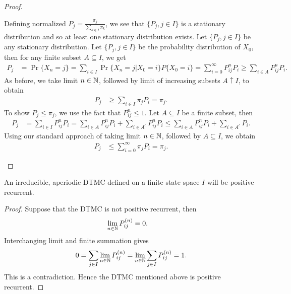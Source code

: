 \documentclass[a4paper,10pt,english]{article}
\begin{document}
\begin{proof}
\begin{enumerate}[i)]
Defining normalized $P_j = \frac{\pi_j}{\sum_{k \in I}\pi_k}$, 
we see that $\{P_j,j \in I\}$ is a stationary distribution and so at least one stationary distribution exists. 
Let $\{P_j,j \in I\}$ be any stationary distribution. Let $\{P_j,j \in I\}$ be the probability distribution of $X_0$, then for any finite subset $A \subseteq I$, we get 
\begin{align*}
P_j &= \Pr\{X_n = j\} = \sum_{i \in I} \Pr\{X_n = j|X_0 = i\} P\{X_0 = i\} = \sum_{i=0}^{\infty} P_{ij}^nP_i \geq \sum_{i \in A} P_{ij}^nP_i.
\end{align*}
As before, we take limit $n \in \mathbb{N}$, followed by limit of increasing subsets $A \uparrow I$, to obtain
\begin{align*}
P_j &\geq \sum_{i \in I} \pi_j P_i = \pi_j.
\end{align*}
To show $P_j \leq \pi_j$, we use the fact that $P_{ij}^n \leq 1$. Let $A \subseteq I$ be a finite subset, then
\begin{align*}
P_j &= \sum_{i \in I} P_{ij}^nP_i = \sum_{i \in A}P_{ij}^nP_i + \sum_{i \in A^c}P_{ij}^nP_i \leq \sum_{i \in A} P_{ij}^{n}P_i + \sum_{i \in A^c} P_i.
\end{align*}
Using our standard approach of taking limit $n \in \mathbb{N}$, followed by $A \subseteq I$, we obtain
\begin{align*}
P_j &\leq \sum_{i=0}^{\infty} \pi_j P_i = \pi_j.
\end{align*}
\end{enumerate}
\end{proof}

\begin{cor} An irreducible, aperiodic DTMC defined on a finite state space $I$ will be positive recurrent.
\end{cor}
\begin{proof}
Suppose that the DTMC is not positive recurrent, then 
\begin{align*}
\lim_{n \in \mathbb{N}}P_{ij}^{(n)} &= 0.
\end{align*}
Interchanging limit and finite summation gives
\begin{align*}
0 = \sum_{j \in I}\lim_{n \in \mathbb{N}}P_{ij}^{(n)}  = \lim_{n \in \mathbb{N}}\sum_{j \in I}P_{ij}^{(n)} = 1.
\end{align*}
This is a contradiction. 
Hence the DTMC mentioned above is positive recurrent.
\end{proof}
\end{document}
